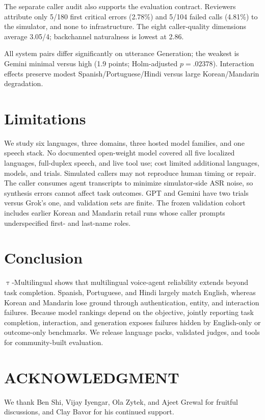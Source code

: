 \documentclass{article}
\newcommand{\taumulti}{$\uptau$-Multilingual}
\begin{document}
The separate caller audit also supports the evaluation contract. Reviewers
attribute only 5/180 first critical errors (2.78\%) and 5/104 failed calls
(4.81\%) to the simulator, and none to infrastructure. The eight caller-quality
dimensions average 3.05/4; backchannel naturalness is lowest at 2.86.

All system pairs differ significantly on utterance Generation; the
weakest is Gemini minimal versus high (1.9 points; Holm-adjusted $p=.02378$).
Interaction effects preserve
modest Spanish/Portuguese/Hindi versus large Korean/Mandarin degradation.

\section{Limitations}
\label{sec:limitations}

We study six languages, three domains, three hosted model families, and one
speech stack. No documented open-weight model covered all five localized
languages, full-duplex speech, and live tool use; cost limited additional
languages, models, and trials.
Simulated callers may not reproduce human timing or repair. The caller
consumes agent transcripts to minimize simulator-side ASR noise, so synthesis
errors cannot affect task outcomes. GPT and
Gemini have two trials versus Grok's one, and validation sets are finite. The
frozen validation cohort includes earlier Korean and Mandarin retail runs whose
caller prompts underspecified first- and last-name roles.

\section{Conclusion}
\label{sec:conclusion}

\taumulti{} shows that multilingual voice-agent reliability extends beyond task
completion. Spanish, Portuguese, and Hindi largely match English, whereas
Korean and Mandarin lose ground through authentication, entity, and interaction
failures. Because model rankings depend on the objective, jointly reporting task
completion, interaction, and generation exposes failures hidden by English-only
or outcome-only benchmarks. We release language packs, validated judges, and
tools for community-built evaluation.

\FloatBarrier
\raggedcolsend

\section*{\centering\normalsize ACKNOWLEDGMENT}
We thank Ben Shi, Vijay Iyengar, Ola Zytek, and Ajeet Grewal for fruitful
discussions, and Clay Bavor for his continued support.
\end{document}
